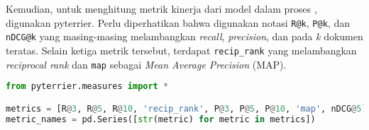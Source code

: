 Kemudian, untuk menghitung metrik kinerja dari model dalam proses \retrieval{}, digunakan \library{} pyterrier. Perlu diperhatikan bahwa digunakan notasi \lstinline{R@k}, \lstinline{P@k}, dan \lstinline{nDCG@k} yang masing-masing melambangkan \textit{recall}, \textit{precision}, dan \ndcg{} pada \textit{k} dokumen teratas. Selain ketiga metrik tersebut, terdapat \lstinline{recip_rank} yang melambangkan \textit{reciprocal rank} dan \lstinline{map} sebagai \textit{Mean Average Precision} (MAP).
\begin{lstlisting}[language=Python, caption={Metrik evaluasi}, label={kode:metrics}]
from pyterrier.measures import *

metrics = [R@3, R@5, R@10, 'recip_rank', P@3, P@5, P@10, 'map', nDCG@5]
metric_names = pd.Series([str(metric) for metric in metrics])
\end{lstlisting}
